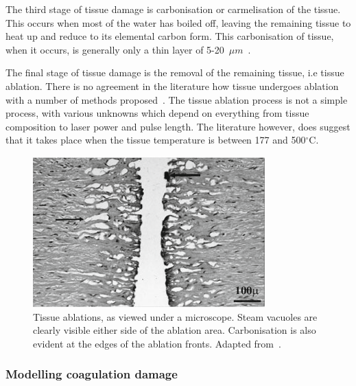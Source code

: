The third stage of tissue damage is carbonisation or carmelisation of the tissue. This occurs when most of the water has boiled off, leaving the remaining tissue to heat up and reduce to its elemental carbon form. This carbonisation of tissue, when it occurs, is generally only a thin layer of 5-20~$\mu m$~\cite{welch2011optical}.

The final stage of tissue damage is the removal of the remaining tissue, i.e tissue ablation. There is no agreement in the literature how tissue undergoes ablation with a number of methods proposed~\cite{vogel2003mechanisms}. The tissue ablation process is not a simple process, with various unknowns which depend on everything from tissue composition to laser power and pulse length. The literature however, does suggest that it takes place when the tissue temperature is between 177 and 500${^{\circ}}$C\cite{gerstmann1994char,mckenzie1986three}.

\begin{figure}	
\vspace{-10pt}
	\centering
	\includegraphics[width=\columnwidth]{./ablation/images/steam_vacoule.png}
	\caption{Tissue ablations, as viewed under a microscope. Steam vacuoles are clearly visible either side of the ablation area. Carbonisation is also evident at the edges of the ablation fronts. Adapted from~\cite{welch2011optical}.}
	\label{fig:histology}
	\vspace{-10pt}
\end{figure}

\subsubsection{Modelling coagulation damage}

